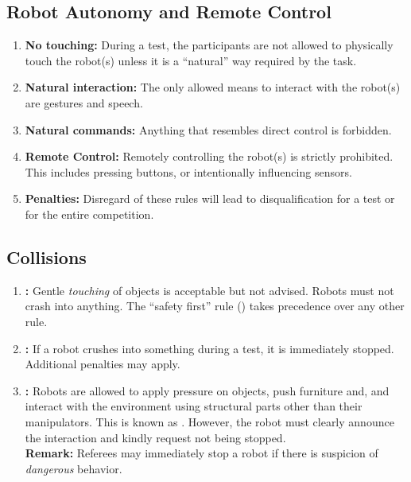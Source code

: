 \subsection{Robot Autonomy and Remote Control}
\begin{enumerate}
	\item \textbf{No touching:} During a test, the participants are not allowed to physically touch the robot(s) unless it is a \enquote{natural} way required by the task.

	\item \textbf{Natural interaction:} The only allowed means to interact with the robot(s) are gestures and speech.

	\item \textbf{Natural commands:} Anything that resembles direct control is forbidden.

	\item \textbf{Remote Control:} Remotely controlling the robot(s) is strictly prohibited.
	This includes pressing buttons, or intentionally influencing sensors.

	\item \textbf{Penalties:} Disregard of these rules will lead to disqualification for a test or for the entire competition.
\end{enumerate}



\subsection{Collisions}
\begin{enumerate}
	\item \textbf{:} Gentle \emph{touching} of objects is acceptable but not advised. 
	Robots must not crash into anything.
	The \enquote{safety first} rule () takes precedence over any other rule.

	\item \textbf{:} If a robot crushes into something during a test, it is immediately stopped. Additional penalties may apply.

	\item \textbf{:} Robots are allowed to apply pressure on objects, push furniture and, and interact with the environment using structural parts other than their manipulators.
	This is known as .
	However, the robot must clearly announce the interaction and kindly request not being stopped.\\
	\textbf{Remark: } Referees may immediately stop a robot if there is suspicion of \emph{dangerous} behavior.
\end{enumerate}

